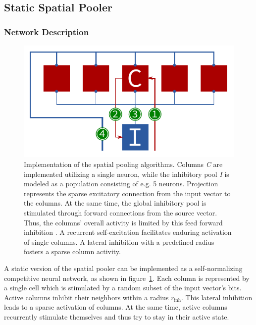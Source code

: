 \subsection{Static Spatial Pooler}

\subsubsection{Network Description}

\begin{figure}
	\begin{center}
		\includegraphics{../circuitry/spatial_pooler.pdf}
	\end{center}
	\caption{Implementation of the spatial pooling algorithms. Columns \emph{C} are implemented utilizing a single neuron, while the inhibitory pool \emph{I} is modeled as a population consisting of e.g. 5 neurons. Projection \protect{} represents the sparse excitatory connection from the input vector to the columns. At the same time, the global inhibitory pool is stimulated through forward connections \protect{} from the source vector. Thus, the columns' overall activity is limited by this feed forward inhibition \protect{}. A recurrent self-excitation \protect{} facilitates enduring activation of single columns. A lateral inhibition with a predefined radius \protect{} fosters a sparse column activity.}
	\label{fig:static_spatial_pooler}
\end{figure}

A static version of the spatial pooler can be implemented as a self-normalizing competitive neural network, as shown in figure~\ref{fig:static_spatial_pooler}. Each column is represented by a single cell which is stimulated by a random subset of the input vector's bits. Active columns inhibit their neighbors within a radius $r_\text{inh}$. This lateral inhibition leads to a sparse activation of columns. At the same time, active columns recurrently stimulate themselves and thus try to stay in their active state.

